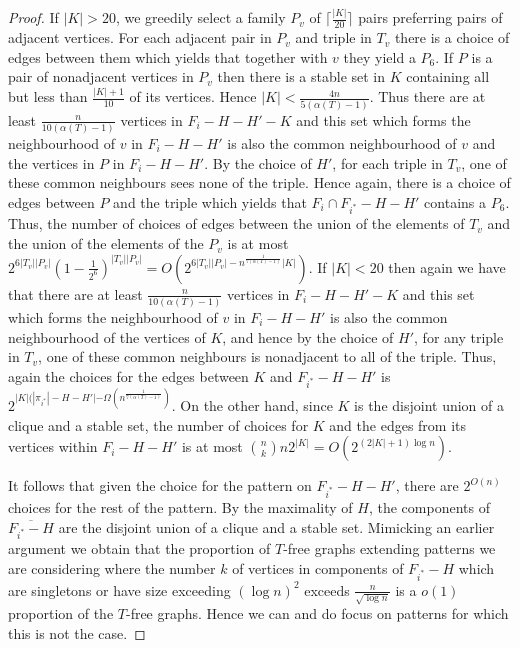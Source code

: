 \documentclass[10pt,a4paper]{amsart}
\begin{document}
\begin{proof}
If $|K| >20$, we greedily  select a family $P_v$   of $\lceil \frac{|K|}{20} \rceil$ pairs 
preferring pairs of adjacent vertices. For each  adjacent pair in $P_v$ and triple in $T_v$ there is a choice of edges between them which yields that together 
with $v$ they yield a $P_6$. If $P$ is a pair of nonadjacent vertices in $P_v$ then there is a stable set in $K$ containing all but  less than $\frac{|K|+1}{10}$ of its 
vertices. Hence $|K|<\frac{4n}{5(\alpha(T)-1)}$. Thus there are at least $\frac{n}{10(\alpha(T)-1)}$ vertices in $F_i-H-H'-K$ and this set which forms the neighbourhood of $v$ 
in $F_i-H-H'$ is also the common neighbourhood of $v$ and the vertices in $P$ in $F_i-H-H'$. By the choice of $H'$, for each triple  in $T_v$, one of these common neighbours 
sees none of the triple.  Hence again,  there is a choice of edges between $P$ and the triple  which yields that $F_i \cap F_{i^*}-H-H'$
contains  a $P_6$. Thus, the number of choices of edges between the union of the elements of $T_v$ and the union of the elements 
of the $P_v$ is at most $2^{6|T_v||P_v|}(1-\frac{1}{2^6})^{|T_v||P_v|}= O( 2^{6|T_v||P_v|- n^{\frac{1}{7(\alpha(T)-1)}}|K|})$. 
If $|K|<20$ then again we have that there are at least $\frac{n}{10(\alpha(T)-1)}$ vertices in $F_i-H-H'-K$ and this set which forms the neighbourhood of $v$ 
in $F_i-H-H'$ is also the common neighbourhood of the vertices of $K$, and hence by the choice of $H'$, for any triple in $T_v$, one of these common neighbours 
is nonadjacent to all of the triple. 
Thus, again the choices for the edges between $K$ and $F_{i^*}-H-H'$ is $2^{|K|(|\pi_{i^*}|-H-H'|-\Omega(n^\frac{1}{7(\alpha(T)-1)})}$. 
On the other hand,  since $K$ is the disjoint union of a clique and a stable set, the number of choices for $K$ and the edges from its vertices within $F_i-H-H'$  is at most ${n \choose k}n 2^{|K|}=O(2^{(2|K|+1)\log n})$. 

It  follows that given  the choice for the pattern 
on $F_{i^*}-H-H'$, there are $2^{O(n)}$ choices for the rest of the pattern. By the maximality of $H$,  the components  of $\overline{F_{i^*}-H}$
are the disjoint union of a clique and a stable set. Mimicking an earlier argument we obtain that the proportion of $T$-free graphs extending patterns we are considering where 
the number $k$ of  vertices in components of $F_{i^*}-H$ which are singletons or have size exceeding $(\log n)^2$  exceeds  $\frac{n}{\sqrt{\log n}}$ is a $o(1)$ proportion 
of the $T$-free graphs.  Hence we can and do focus on patterns for which this is not the case. 


\end{proof}
\end{document}
